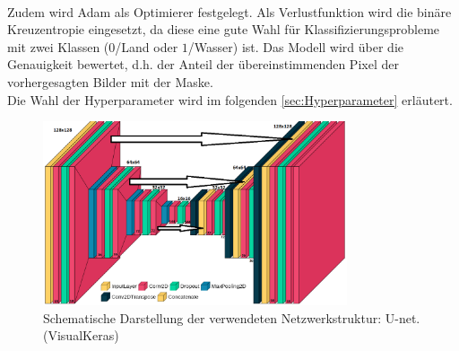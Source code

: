 \\
Zudem wird Adam als Optimierer festgelegt.
Als Verlustfunktion wird die binäre Kreuzentropie eingesetzt, da diese eine gute Wahl für Klassifizierungsprobleme mit zwei Klassen ($0$/Land oder $1$/Wasser) ist.
Das Modell wird über die Genauigkeit bewertet, d.h. der Anteil der übereinstimmenden Pixel der vorhergesagten Bilder mit der Maske.
\\
Die Wahl der Hyperparameter wird im folgenden \autoref{sec:Hyperparameter} erläutert.
\begin{figure}
    \centering
    \includegraphics[width=0.8\textwidth]{content/img/unet_struc_bearbeitet_2.png}
    \caption{Schematische Darstellung der verwendeten Netzwerkstruktur: U-net. (VisualKeras)}
    \label{fig:unet_structure}
\end{figure}

\FloatBarrier

